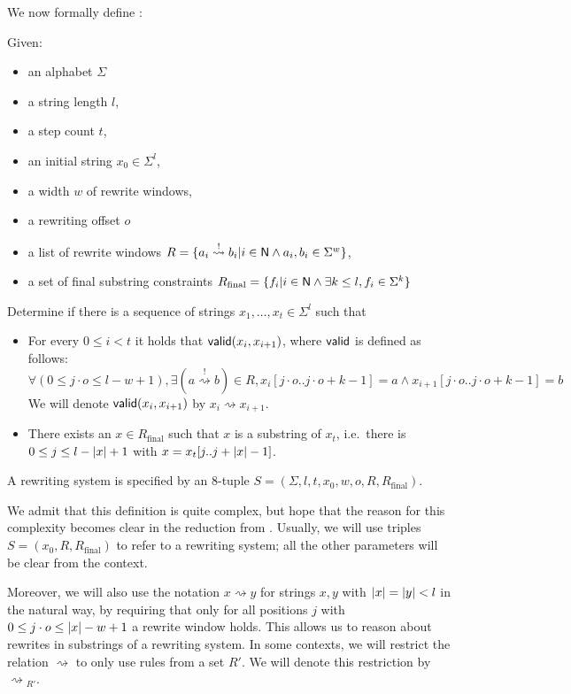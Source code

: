 \documentclass[a4paper,UKenglish,cleveref, autoref]{lipics-v2019}
\newcommand{\strent}{\rightsquigarrow}
\newcommand{\constrent}{\overset{!}{\rightsquigarrow}}
\newcommand{\Rfinal}{R_{\text{final}}}
\begin{document}
We now formally define \strconrew{}:
\begin{definition}\label{def:strconrew}
  Given: 
  \begin{itemize}
    \item an alphabet $\Sigma$
    \item a string length $l$,
    \item a step count $t$,
    \item an initial string $x_0 \in \Sigma^l$,
    \item a width $w$ of rewrite windows, 
    \item a rewriting offset $o$
    \item a list of rewrite windows $R = \{a_i \constrent b_i | i \in \nat \land a_i, b_i \in \Sigma^w\}$,
    \item a set of final substring constraints $\Rfinal = \{f_i | i \in \nat \land \exists k \le l, f_i \in \Sigma^k\}$
  \end{itemize}

  Determine if there is a sequence of strings $x_1, \ldots, x_t \in \Sigma^l$ such that 
  \begin{itemize}
    \item For every $0 \le i < t$ it holds that $\textsf{valid}(x_i, x_{i+1})$, where $\textsf{valid}$ is defined as follows:
      \[\forall (0 \le j\cdot o \le l -w + 1), \exists (a \constrent b) \in R, x_i[j\cdot o..j\cdot o+ k-1] = a \land x_{i+1}[j\cdot o..j\cdot o+k-1] = b \]
      We will denote $\textsf{valid}(x_i, x_{i+1})$ by $x_i \strent{} x_{i+1}$. 
    \item There exists an $x \in \Rfinal$ such that $x$ is a substring of $x_t$, i.e.\ there is $0 \le j \le l - |x| + 1$ with $x = x_t[j..j+|x| - 1]$.
  \end{itemize}

  A rewriting system is specified by an 8-tuple $S = (\Sigma, l, t, x_0, w, o, R, \Rfinal)$.
\end{definition}

We admit that this definition is quite complex, but hope that the reason for this complexity becomes clear in the reduction from \gennp{}.
Usually, we will use triples $S = (x_0, R, \Rfinal)$ to refer to a rewriting system; all the other parameters will be clear from the context.

Moreover, we will also use the notation $x \strent{} y$ for strings $x, y$ with $|x| = |y| < l$ in the natural way, by requiring that only for all positions $j$ with $0 \le j \cdot o \le |x| - w + 1$ a rewrite window holds. This allows us to reason about rewrites in substrings of a rewriting system. 
In some contexts, we will restrict the relation $\strent{}$ to only use rules from a set $R'$. We will denote this restriction by $\strent{}_{R'}$.
\end{document}
